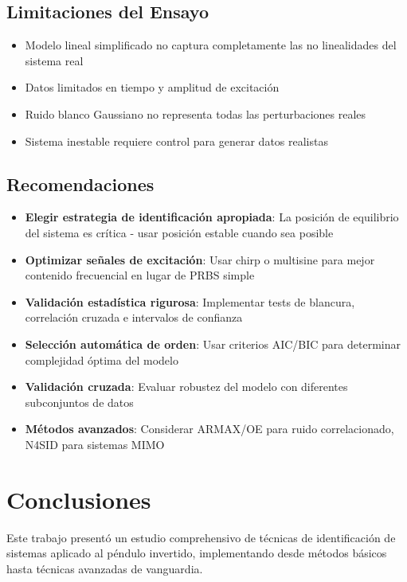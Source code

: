 \documentclass[a4paper,openright,9pt]{report}
\begin{document}
\subsection{Limitaciones del Ensayo}

\begin{itemize}
\item Modelo lineal simplificado no captura completamente las no linealidades del sistema real
\item Datos limitados en tiempo y amplitud de excitación
\item Ruido blanco Gaussiano no representa todas las perturbaciones reales
\item Sistema inestable requiere control para generar datos realistas
\end{itemize}

\subsection{Recomendaciones}

\begin{itemize}
\item \textbf{Elegir estrategia de identificación apropiada}: La posición de equilibrio del sistema es crítica - usar posición estable cuando sea posible
\item \textbf{Optimizar señales de excitación}: Usar chirp o multisine para mejor contenido frecuencial en lugar de PRBS simple
\item \textbf{Validación estadística rigurosa}: Implementar tests de blancura, correlación cruzada e intervalos de confianza
\item \textbf{Selección automática de orden}: Usar criterios AIC/BIC para determinar complejidad óptima del modelo
\item \textbf{Validación cruzada}: Evaluar robustez del modelo con diferentes subconjuntos de datos
\item \textbf{Métodos avanzados}: Considerar ARMAX/OE para ruido correlacionado, N4SID para sistemas MIMO
\end{itemize}

\section{Conclusiones}

Este trabajo presentó un estudio comprehensivo de técnicas de identificación de sistemas aplicado al péndulo invertido, implementando desde métodos básicos hasta técnicas avanzadas de vanguardia.
\end{document}
